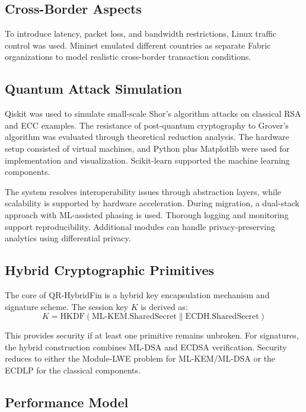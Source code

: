 \documentclass[pdflatex,sn-basic,english]{sn-jnl}
\begin{document}
\subsection{Cross-Border Aspects}

To introduce latency, packet loss, and bandwidth restrictions, Linux traffic control was used. Mininet emulated different countries as separate Fabric organizations to model realistic cross-border transaction conditions.

\subsection{Quantum Attack Simulation}

Qiskit was used to simulate small-scale Shor's algorithm attacks on classical RSA and ECC examples. The resistance of post-quantum cryptography to Grover's algorithm was evaluated through theoretical reduction analysis. The hardware setup consisted of virtual machines, and Python plus Matplotlib were used for implementation and visualization. Scikit-learn supported the machine learning components.

The system resolves interoperability issues through abstraction layers, while scalability is supported by hardware acceleration. During migration, a dual-stack approach with ML-assisted phasing is used. Thorough logging and monitoring support reproducibility. Additional modules can handle privacy-preserving analytics using differential privacy.

\subsection{Hybrid Cryptographic Primitives}

The core of QR-HybridFin is a hybrid key encapsulation mechanism and signature scheme. The session key \(K\) is derived as:
\begin{equation}
K = \mathrm{HKDF}\left( \text{ML-KEM.SharedSecret} \parallel \text{ECDH.SharedSecret} \right)
\end{equation}

This provides security if at least one primitive remains unbroken. For signatures, the hybrid construction combines ML-DSA and ECDSA verification. Security reduces to either the Module-LWE problem for ML-KEM/ML-DSA or the ECDLP for the classical components.

\subsection{Performance Model}
\end{document}
